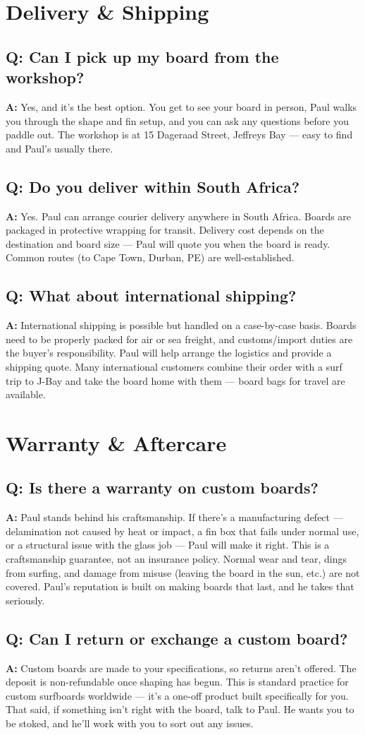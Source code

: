 \documentclass[11pt,a4paper]{article}
\newcommand{\question}[1]{\subsection*{Q: #1}}
\newcommand{\answer}{\noindent\textbf{A:} }
\begin{document}
\section{Delivery \& Shipping}

\question{Can I pick up my board from the workshop?}
\answer Yes, and it's the best option. You get to see your board in person, Paul walks you through the shape and fin setup, and you can ask any questions before you paddle out. The workshop is at 15 Dageraad Street, Jeffreys Bay --- easy to find and Paul's usually there.

\question{Do you deliver within South Africa?}
\answer Yes. Paul can arrange courier delivery anywhere in South Africa. Boards are packaged in protective wrapping for transit. Delivery cost depends on the destination and board size --- Paul will quote you when the board is ready. Common routes (to Cape Town, Durban, PE) are well-established.

\question{What about international shipping?}
\answer International shipping is possible but handled on a case-by-case basis. Boards need to be properly packed for air or sea freight, and customs/import duties are the buyer's responsibility. Paul will help arrange the logistics and provide a shipping quote. Many international customers combine their order with a surf trip to J-Bay and take the board home with them --- board bags for travel are available.

\section{Warranty \& Aftercare}

\question{Is there a warranty on custom boards?}
\answer Paul stands behind his craftsmanship. If there's a manufacturing defect --- delamination not caused by heat or impact, a fin box that fails under normal use, or a structural issue with the glass job --- Paul will make it right. This is a craftsmanship guarantee, not an insurance policy. Normal wear and tear, dings from surfing, and damage from misuse (leaving the board in the sun, etc.) are not covered. Paul's reputation is built on making boards that last, and he takes that seriously.

\question{Can I return or exchange a custom board?}
\answer Custom boards are made to your specifications, so returns aren't offered. The deposit is non-refundable once shaping has begun. This is standard practice for custom surfboards worldwide --- it's a one-off product built specifically for you. That said, if something isn't right with the board, talk to Paul. He wants you to be stoked, and he'll work with you to sort out any issues.
\end{document}
